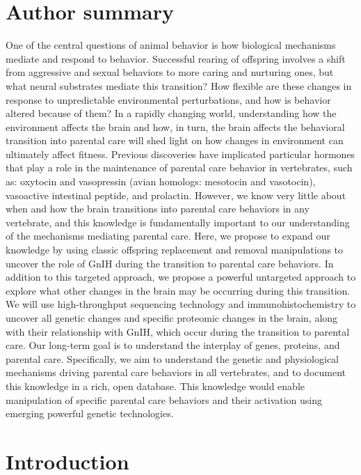 \documentclass[10pt,letterpaper]{article}
\begin{document}
\section*{Author summary}
One of the central questions of animal behavior is how biological
mechanisms mediate and respond to behavior. Successful rearing of
offspring involves a shift from aggressive and sexual behaviors to more
caring and nurturing ones, but what neural substrates mediate this
transition? How flexible are these changes in response to unpredictable
environmental perturbations, and how is behavior altered because of
them? In a rapidly changing world, understanding how the environment
affects the brain and how, in turn, the brain affects the behavioral
transition into parental care will shed light on how changes in
environment can ultimately affect fitness. Previous discoveries have
implicated particular hormones that play a role in the maintenance of
parental care behavior in vertebrates, such as: oxytocin and vasopressin
(avian homologs: mesotocin and vasotocin), vasoactive intestinal
peptide, and prolactin. However, we know very little about when and how
the brain transitions into parental care behaviors in any vertebrate,
and this knowledge is fundamentally important to our understanding of
the mechanisms mediating parental care. Here, we propose to expand our
knowledge by using classic offspring replacement and removal
manipulations to uncover the role of GnIH during the transition to
parental care behaviors. In addition to this targeted approach, we
propose a powerful untargeted approach to explore what other changes in
the brain may be occurring during this transition. We will use
high-throughput sequencing technology and immunohistochemistry to
uncover all genetic changes and specific proteomic changes in the brain,
along with their relationship with GnIH, which occur during the
transition to parental care. Our long-term goal is to understand the
interplay of genes, proteins, and parental care. Specifically, we aim to
understand the genetic and physiological mechanisms driving parental
care behaviors in all vertebrates, and to document this knowledge in a
rich, open database. This knowledge would enable manipulation of
specific parental care behaviors and their activation using emerging
powerful genetic technologies.

\linenumbers

\hypertarget{introduction}{%
\section{Introduction}\label{introduction}}
\end{document}
